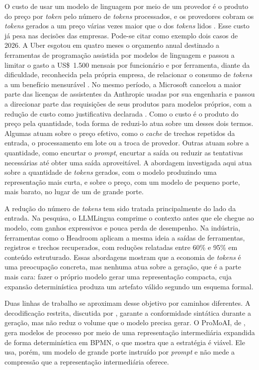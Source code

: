 O custo de usar um modelo de linguagem por meio de um provedor é o produto do preço por \textit{token} pelo número de \textit{tokens} processados, e os provedores cobram os \textit{tokens} gerados a um preço várias vezes maior que o dos \textit{tokens} lidos \cite{togetherpricing2026}. Esse custo já pesa nas decisões das empresas. Pode-se citar como exemplo dois casos de 2026. A Uber esgotou em quatro meses o orçamento anual destinado a ferramentas de programação assistida por modelos de linguagem e passou a limitar o gasto a US\$~1.500 mensais por funcionário e por ferramenta, diante da dificuldade, reconhecida pela própria empresa, de relacionar o consumo de \textit{tokens} a um benefício mensurável \cite{ropek2026uber}. No mesmo período, a Microsoft cancelou a maior parte das licenças de assistentes da Anthropic usadas por sua engenharia e passou a direcionar parte das requisições de seus produtos para modelos próprios, com a redução de custo como justificativa declarada \cite{cooter2026microsoft}. Como o custo é o produto do preço pela quantidade, toda forma de reduzi-lo atua sobre um desses dois termos. Algumas atuam sobre o preço efetivo, como o \textit{cache} de trechos repetidos da entrada, o processamento em lote ou a troca de provedor. Outras atuam sobre a quantidade, como encurtar o \textit{prompt}, encurtar a saída ou reduzir as tentativas necessárias até obter uma saída aproveitável. A abordagem investigada aqui atua sobre a quantidade de \textit{tokens} gerados, com o modelo produzindo uma representação mais curta, e sobre o preço, com um modelo de pequeno porte, mais barato, no lugar de um de grande porte.

A redução do número de \textit{tokens} tem sido tratada principalmente do lado da entrada. Na pesquisa, o LLMLingua \cite{jiang2023llmlingua} comprime o contexto antes que ele chegue ao modelo, com ganhos expressivos e pouca perda de desempenho. Na indústria, ferramentas como o Headroom \cite{headroom2026} aplicam a mesma ideia a saídas de ferramentas, registros e trechos recuperados, com reduções relatadas entre 60\% e 95\% em conteúdo estruturado. Essas abordagens mostram que a economia de \textit{tokens} é uma preocupação concreta, mas nenhuma atua sobre a geração, que é a parte mais cara: fazer o próprio modelo gerar uma representação compacta, cuja expansão determinística produza um artefato válido segundo um esquema formal.

Duas linhas de trabalho se aproximam desse objetivo por caminhos diferentes. A decodificação restrita, discutida por , garante a conformidade sintática durante a geração, mas não reduz o volume que o modelo precisa gerar. O ProMoAI, de , gera modelos de processo por meio de uma representação intermediária expandida de forma determinística em BPMN, o que mostra que a estratégia é viável. Ele usa, porém, um modelo de grande porte instruído por \textit{prompt} e não mede a compressão que a representação intermediária oferece.

